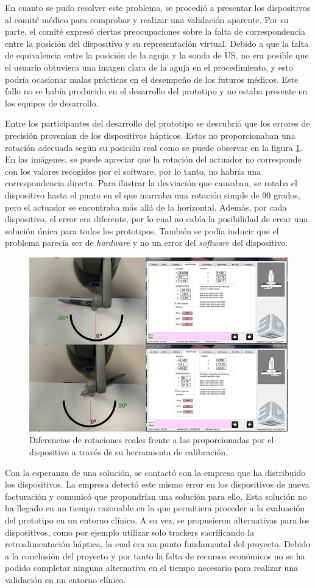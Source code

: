 En cuanto se pudo resolver este problema, se procedió a presentar los dispositivos al comité médico para comprobar y realizar una validación aparente. Por su parte, el comité expresó ciertas preocupaciones sobre la falta de correspondencia entre la posición del dispositivo y su representación virtual. Debido a que la falta de equivalencia entre la posición de la aguja y la sonda de \ac{US}, no era posible que el usuario obtuviera una imagen clara de la aguja en el procedimiento, y esto podría ocasionar malas prácticas en el desempeño de los futuros médicos. Este fallo no se había producido en el desarrollo del prototipo y no estaba presente en los equipos de desarrollo. 

Entre los participantes del desarrollo del prototipo se descubrió que los errores de precisión provenían de los dispositivos hápticos. Estos no proporcionaban una rotación adecuada según su posición real como se puede observar en la figura \ref{fig:errorhaptic}. En las imágenes, se puede apreciar que la rotación del actuador no corresponde con los valores recogidos por el software, por lo tanto, no habría una correspondencia directa. Para ilustrar la desviación que causaban, se rotaba el dispositivo hasta el punto en el que marcaba una rotación simple de 90 grados, pero el actuador se encontraba más allá de la horizontal. Además, por cada dispositivo, el error era diferente, por lo cual no cabía la posibilidad de crear una solución única para todos los prototipos. También se podía inducir que el problema parecía ser de \emph{hardware} y no un error del \emph{software} del dispositivo.


\begin{figure}[h]
\centering
\includegraphics[width=0.5\linewidth]{IMG/errorhaptic.png}
\caption{\label{fig:errorhaptic}Diferencias de rotaciones reales frente a las proporcionadas por el dispositivo a través de su herramienta de calibración.}
\end{figure}

Con la esperanza de una solución, se contactó con la empresa que ha distribuido los dispositivos. La empresa detectó este mismo error en los dispositivos de nueva facturación y comunicó que propondrían una solución para ello. Esta solución no ha llegado en un tiempo razonable en la que permitiera proceder a la evaluación del prototipo en un entorno clínico. A su vez, se propusieron alternativas para los dispositivos, como por ejemplo utilizar solo \ac{tracker}s sacrificando la retroalimentación háptica, la cual era un punto fundamental del proyecto. Debido a la conclusión del proyecto y por tanto la falta de recursos económicos no se ha podido completar ninguna alternativa en el tiempo necesario para realizar una validación en un entorno clínico.




